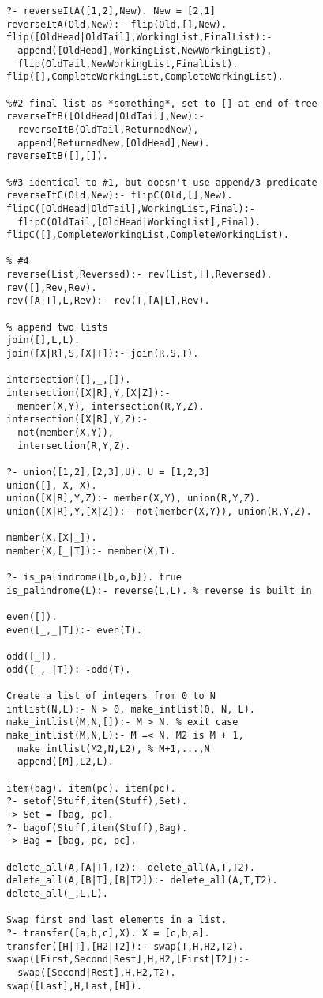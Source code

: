 \documentclass[8pt,letterpaper,twocolumn]{article}
\begin{document}
\begin{verbatim}
?- reverseItA([1,2],New). New = [2,1]
reverseItA(Old,New):- flip(Old,[],New).
flip([OldHead|OldTail],WorkingList,FinalList):-
  append([OldHead],WorkingList,NewWorkingList),
  flip(OldTail,NewWorkingList,FinalList).
flip([],CompleteWorkingList,CompleteWorkingList).

%#2 final list as *something*, set to [] at end of tree
reverseItB([OldHead|OldTail],New):-
  reverseItB(OldTail,ReturnedNew),
  append(ReturnedNew,[OldHead],New).
reverseItB([],[]).

%#3 identical to #1, but doesn't use append/3 predicate
reverseItC(Old,New):- flipC(Old,[],New).
flipC([OldHead|OldTail],WorkingList,Final):-
  flipC(OldTail,[OldHead|WorkingList],Final).
flipC([],CompleteWorkingList,CompleteWorkingList).

% #4
reverse(List,Reversed):- rev(List,[],Reversed).
rev([],Rev,Rev).
rev([A|T],L,Rev):- rev(T,[A|L],Rev).

% append two lists
join([],L,L).
join([X|R],S,[X|T]):- join(R,S,T).

intersection([],_,[]).
intersection([X|R],Y,[X|Z]):-
  member(X,Y), intersection(R,Y,Z).
intersection([X|R],Y,Z):-
  not(member(X,Y)),
  intersection(R,Y,Z).

?- union([1,2],[2,3],U). U = [1,2,3]
union([], X, X).
union([X|R],Y,Z):- member(X,Y), union(R,Y,Z).
union([X|R],Y,[X|Z]):- not(member(X,Y)), union(R,Y,Z).

member(X,[X|_]).
member(X,[_|T]):- member(X,T).

?- is_palindrome([b,o,b]). true
is_palindrome(L):- reverse(L,L). % reverse is built in

even([]).
even([_,_|T]):- even(T).

odd([_]).
odd([_,_|T]): -odd(T).

Create a list of integers from 0 to N
intlist(N,L):- N > 0, make_intlist(0, N, L).
make_intlist(M,N,[]):- M > N. % exit case
make_intlist(M,N,L):- M =< N, M2 is M + 1,
  make_intlist(M2,N,L2), % M+1,...,N
  append([M],L2,L).

item(bag). item(pc). item(pc).
?- setof(Stuff,item(Stuff),Set).
-> Set = [bag, pc].
?- bagof(Stuff,item(Stuff),Bag).
-> Bag = [bag, pc, pc].

delete_all(A,[A|T],T2):- delete_all(A,T,T2).
delete_all(A,[B|T],[B|T2]):- delete_all(A,T,T2).
delete_all(_,L,L).

Swap first and last elements in a list.
?- transfer([a,b,c],X). X = [c,b,a].
transfer([H|T],[H2|T2]):- swap(T,H,H2,T2).
swap([First,Second|Rest],H,H2,[First|T2]):-
  swap([Second|Rest],H,H2,T2).
swap([Last],H,Last,[H]).


\end{verbatim}
\end{document}
